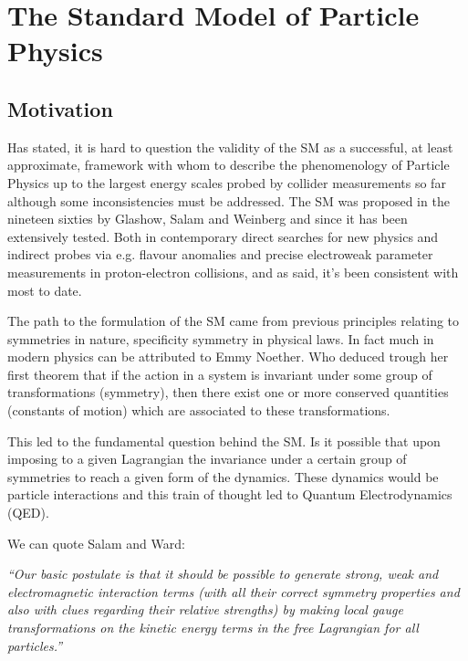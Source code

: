 \newpage 
\chapter{The Standard Model of Particle Physics}

%

\section{Motivation}

Has stated, it is hard to question the validity of the SM as a successful, at least approximate, framework with whom to describe the phenomenology of Particle Physics up to the largest energy scales probed by collider measurements so far although some inconsistencies must be addressed.  
%
The SM was proposed in the nineteen sixties by Glashow, Salam and Weinberg and since it has been extensively tested. Both in contemporary direct searches for new physics and indirect probes via e.g. flavour anomalies and precise electroweak parameter measurements in proton-electron collisions, { \color{gray} and as said, it's been consistent with most to date.} 

The path to the formulation of the SM came from previous principles relating to symmetries in nature, specificity symmetry in physical laws. In fact much in modern physics can be attributed to Emmy Noether. Who deduced trough her first theorem that if the action in a system is invariant under some group of transformations (symmetry), then there exist one or more conserved quantities (constants of motion) which are associated to these transformations. 

This led to the fundamental question behind the SM. Is it possible that upon imposing to a given Lagrangian the invariance under a certain group of symmetries to reach a given form of the dynamics. These dynamics would be particle interactions and this train of thought led to Quantum Electrodynamics (QED).

We can quote Salam and Ward: %

\textit{“Our basic postulate is that it should be possible to generate strong,  weak and electromagnetic  interaction terms (with all their correct symmetry properties and also with clues regarding their relative strengths) by making local gauge transformations on the kinetic energy terms in the free Lagrangian for all particles.”}

